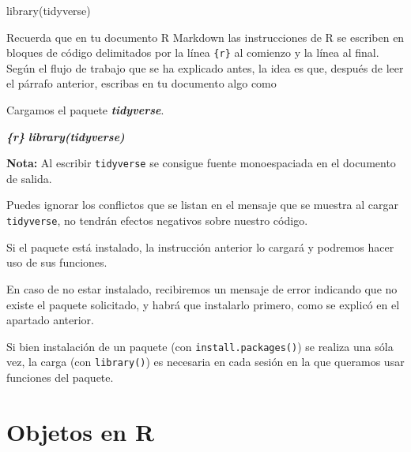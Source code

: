\documentclass[
  title=normal,
  notoc,
  bib=normal]{mnye}
\newenvironment{Shaded}{\begin{snugshade}}{\end{snugshade}}
\newcommand{\FunctionTok}[1]{\textcolor[rgb]{0.00,0.00,0.00}{#1}}
\newcommand{\InformationTok}[1]{\textcolor[rgb]{0.56,0.35,0.01}{\textbf{\textit{#1}}}}
\newcommand{\NormalTok}[1]{#1}
\begin{document}
\begin{Shaded}
\begin{Highlighting}[]
\FunctionTok{library}\NormalTok{(tidyverse)}
\end{Highlighting}
\end{Shaded}

\begin{infobox}
Recuerda que en tu documento R Markdown las instrucciones de \textsf{R} se escriben en bloques de código delimitados por la línea \texttt{\textasciigrave{}\textasciigrave{}\textasciigrave{}\{r\}} al comienzo y la línea \texttt{\textasciigrave{}\textasciigrave{}\textasciigrave{}} al final. Según el flujo de trabajo que se ha explicado antes, la idea es que, después de leer el párrafo anterior, escribas en tu documento algo como

\begin{Shaded}
\begin{Highlighting}[]
\NormalTok{Cargamos el paquete }\InformationTok{\textasciigrave{}tidyverse\textasciigrave{}}\NormalTok{.}

\InformationTok{\textasciigrave{}\textasciigrave{}\textasciigrave{}\{r\}}
\InformationTok{library(tidyverse)}
\InformationTok{\textasciigrave{}\textasciigrave{}\textasciigrave{}}
\end{Highlighting}
\end{Shaded}

\textbf{Nota:} Al escribir \texttt{\textasciigrave{}tidyverse\textasciigrave{}} se consigue fuente monoespaciada en el documento de salida.

\end{infobox}

Puedes ignorar los conflictos que se listan en el mensaje que se muestra al cargar \texttt{tidyverse}, no tendrán efectos negativos sobre nuestro código.

Si el paquete está instalado, la instrucción anterior lo cargará y podremos hacer uso de sus funciones.

En caso de no estar instalado, recibiremos un mensaje de error indicando que no existe el paquete solicitado, y habrá que instalarlo primero, como se explicó en el apartado anterior.

Si bien instalación de un paquete (con \texttt{install.packages()}) se realiza una sóla vez, la carga (con \texttt{library()}) es necesaria en cada sesión en la que queramos usar funciones del paquete.

\hypertarget{objects}{%
\section{Objetos en R}\label{objects}}
\end{document}
